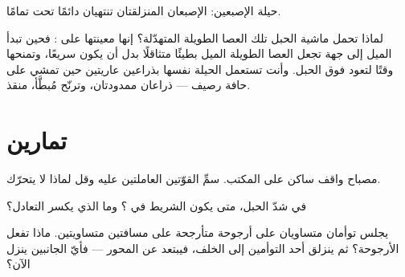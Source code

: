 \begin{omfigure}

{\small حيلة الإصبعين: الإصبعان المنزلقتان تنتهيان دائمًا تحت
 تمامًا.}
\end{omfigure}

\begin{example}\label{ex:g2:balance-equilibrium:acrobat}
لماذا تحمل ماشية الحبل تلك العصا الطويلة المتهدّلة؟ إنها معينتها
على : فحين تبدأ الميل إلى جهة تجعل العصا الطويلة الميل
بطيئًا متثاقلًا بدل أن يكون سريعًا، وتمنحها وقتًا لتعود فوق
الحبل. وأنت تستعمل الحيلة نفسها بذراعين عاريتين حين تمشي على حافة
رصيف --- ذراعان ممدودتان، وترنّح مُبطَّأ،  منقذ.
\end{example}

\section{تمارين}

\begin{exercise}[$\star$]\label{exo:g2:balance-equilibrium:1}
مصباح واقف ساكن على المكتب. سمِّ القوّتين العاملتين عليه وقل
لماذا لا يتحرّك.
\end{exercise}

\begin{exercise}[$\star$]\label{exo:g2:balance-equilibrium:2}
في شدّ الحبل، متى يكون الشريط في ؟ وما الذي يكسر التعادل؟
\end{exercise}

\begin{exercise}[$\star$]\label{exo:g2:balance-equilibrium:3}
يجلس توأمان متساويان على أرجوحة متأرجحة على مسافتين متساويتين.
ماذا تفعل الأرجوحة؟ ثم ينزلق أحد التوأمين إلى الخلف، فيبتعد عن
المحور --- فأيّ الجانبين ينزل الآن؟
\end{exercise}

